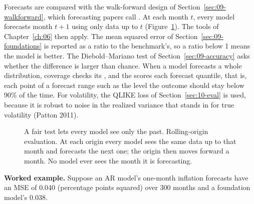 Forecasts are compared with the walk-forward design of Section~\ref{sec:09-walkforward}, which forecasting papers call . At each month $t$, every model forecasts month $t+1$ using only data up to $t$ (Figure~\ref{fig:21-rolling}). The tools of Chapter~\ref{ch:06} then apply. The mean squared error of Section~\ref{sec:09-foundations} is reported as a ratio to the benchmark's, so a ratio below 1 means the model is better. The Diebold--Mariano test of Section~\ref{sec:09-accuracy} asks whether the difference is larger than chance. When a model forecasts a whole distribution, coverage checks its , and the  scores each forecast quantile, that is, each point of a forecast range such as the level the outcome should stay below 90\% of the time. For volatility, the QLIKE loss of Section~\ref{sec:10-eval} is used, because it is robust to noise in the realized variance that stands in for true volatility (Patton 2011).

\begin{figure}[htbp]
\centering
{}
\caption{A fair test lets every model see only the past. Rolling-origin evaluation. At each origin every model sees the same data up to that month and forecasts the next one; the origin then moves forward a month. No model ever sees the month it is forecasting.}
\label{fig:21-rolling}
\end{figure}

\textbf{Worked example.} Suppose an AR model's one-month inflation forecasts have an MSE of 0.040 (percentage points squared) over 300 months and a foundation model's 0.038.

